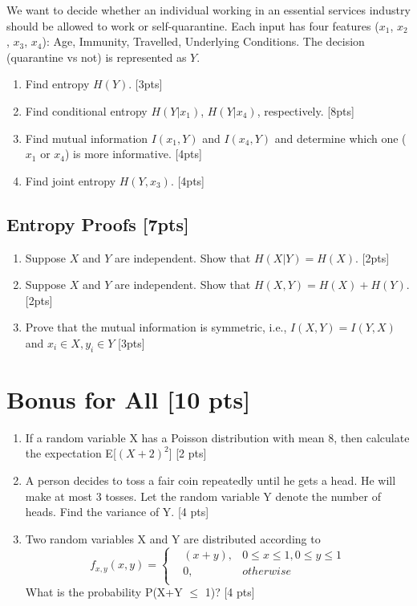 \documentclass{article}
\begin{document}
We want to decide whether an individual working in an essential services industry should be allowed to work or self-quarantine. Each input has four features ($x_1$, $x_2$, $x_3$, $x_4$): Age, Immunity, Travelled, Underlying Conditions. The decision (quarantine vs not) is represented as $Y$.
\begin{enumerate}[label=(\alph*)]
\item Find entropy $H(Y)$. [3pts]

\item Find conditional entropy $H(Y|x_1)$, $H(Y|x_4)$, respectively. [8pts]

\item Find mutual information $I(x_1, Y)$ and $I(x_4, Y)$ and determine which one ($x_1$ or $x_4$) is more informative. [4pts]
\item Find joint entropy $H(Y, x_3)$. [4pts] 
\end{enumerate}

\subsection{Entropy Proofs [7pts]}
\begin{enumerate}[label=(\alph*)]
\item Suppose $X$ and $Y$ are independent. Show that $H(X|Y) = H(X)$. [2pts]



\item Suppose $X$ and $Y$ are independent. Show that $H(X,Y) = H(X) + H(Y)$. [2pts]

  
\item Prove that the mutual information is symmetric, i.e., $I(X, Y) = I(Y, X)$ and $x_i \in X, y_i \in Y$ [3pts]

\end{enumerate}

\section{Bonus for All [10 pts]}

\begin{enumerate}[label=(\alph*)]
\item If a random variable X has a Poisson distribution with mean 8, then calculate the expectation E[${(X+2)^{2}}$] [2 pts]

\item A person decides to toss a fair coin repeatedly until he gets a head. He will make at most 3 tosses. Let the random variable Y denote the number of heads. Find the variance of Y. [4 pts]

\item Two random variables X and Y are distributed according to 
$$f_{x,y}(x,y)=\left\{
\begin{aligned}
&(x+y), & 0\leq x\leq1,0\leq y\leq1 \\
&0, & otherwise\\
\end{aligned}
\right.$$
What is the probability P(X+Y $\leq$ 1)? 
 [4 pts]

\end{enumerate}
\end{document}
